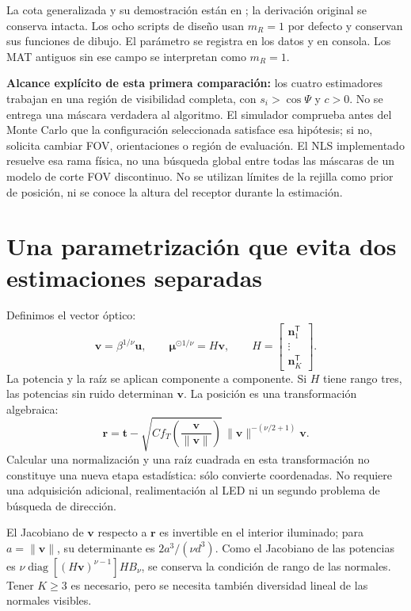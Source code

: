 \documentclass[11pt,a4paper]{article}
\begin{document}
La cota generalizada y su demostración están en ; la derivación original se conserva intacta. Los ocho scripts de diseño usan $m_R=1$ por defecto y conservan sus funciones de dibujo. El parámetro se registra en los datos y en consola. Los MAT antiguos sin ese campo se interpretan como $m_R=1$.

\textbf{Alcance explícito de esta primera comparación:} los cuatro estimadores trabajan en una región de visibilidad completa, con $s_i>\cos\Psi$ y $c>0$. No se entrega una máscara verdadera al algoritmo. El simulador comprueba antes del Monte Carlo que la configuración seleccionada satisface esa hipótesis; si no, solicita cambiar FOV, orientaciones o región de evaluación. El NLS implementado resuelve esa rama física, no una búsqueda global entre todas las máscaras de un modelo de corte FOV discontinuo. No se utilizan límites de la rejilla como prior de posición, ni se conoce la altura del receptor durante la estimación.

\section{Una parametrización que evita dos estimaciones separadas}
Definimos el vector óptico:
\begin{equation}
 \mathbf v=\beta^{1/\nu}\mathbf u,\qquad \bm\mu^{\odot1/\nu}=H\mathbf v,
 \qquad H=\begin{bmatrix}\mathbf n_1^{\mathsf T}\\\vdots\\\mathbf n_K^{\mathsf T}\end{bmatrix}.
\label{eq:linear}
\end{equation}
La potencia y la raíz se aplican componente a componente. Si $H$ tiene rango tres, las potencias sin ruido determinan $\mathbf v$. La posición es una transformación algebraica:
\begin{equation}
 \mathbf r=\mathbf t-
 \sqrt{Cf_T\!\left(\frac{\mathbf v}{\|\mathbf v\|}\right)}\,
 \|\mathbf v\|^{-(\nu/2+1)}\mathbf v.
\label{eq:direct_position}
\end{equation}
Calcular una normalización y una raíz cuadrada en esta transformación no constituye una nueva etapa estadística: sólo convierte coordenadas. No requiere una adquisición adicional, realimentación al LED ni un segundo problema de búsqueda de dirección.

El Jacobiano de $\mathbf v$ respecto a $\mathbf r$ es invertible en el interior iluminado; para $a=\|\mathbf v\|$, su determinante es $2a^3/(\nu d^3)$. Como el Jacobiano de las potencias es $\nu\operatorname{diag}[(H\mathbf v)^{\nu-1}]H B_\nu$, se conserva la condición de rango de las normales. Tener $K\geq3$ es necesario, pero se necesita también diversidad lineal de las normales visibles.
\end{document}
